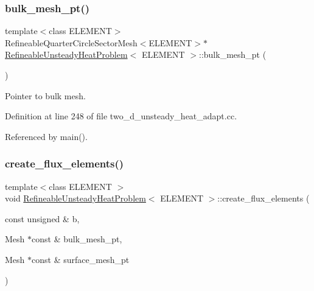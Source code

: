 \subsubsection{\texorpdfstring{bulk\+\_\+mesh\+\_\+pt()}{bulk\_mesh\_pt()}}
{\footnotesize\ttfamily template$<$class E\+L\+E\+M\+E\+NT$>$ \\
Refineable\+Quarter\+Circle\+Sector\+Mesh$<$E\+L\+E\+M\+E\+NT$>$$\ast$ \hyperlink{classRefineableUnsteadyHeatProblem}{Refineable\+Unsteady\+Heat\+Problem}$<$ E\+L\+E\+M\+E\+NT $>$\+::bulk\+\_\+mesh\+\_\+pt (\begin{DoxyParamCaption}{ }\end{DoxyParamCaption})\hspace{0.3cm}{\ttfamily [inline]}}



Pointer to bulk mesh. 



Definition at line 248 of file two\+\_\+d\+\_\+unsteady\+\_\+heat\+\_\+adapt.\+cc.



Referenced by main().

\mbox{\label{classRefineableUnsteadyHeatProblem_a65601ec64c73ac578b43f4af04c46569}} 
\subsubsection{\texorpdfstring{create\+\_\+flux\+\_\+elements()}{create\_flux\_elements()}}
{\footnotesize\ttfamily template$<$class E\+L\+E\+M\+E\+NT $>$ \\
void \hyperlink{classRefineableUnsteadyHeatProblem}{Refineable\+Unsteady\+Heat\+Problem}$<$ E\+L\+E\+M\+E\+NT $>$\+::create\+\_\+flux\+\_\+elements (\begin{DoxyParamCaption}\item[{const unsigned \&}]{b,  }\item[{Mesh $\ast$const \&}]{bulk\+\_\+mesh\+\_\+pt,  }\item[{Mesh $\ast$const \&}]{surface\+\_\+mesh\+\_\+pt }\end{DoxyParamCaption})}



